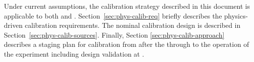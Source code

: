 Under current assumptions, the calibration strategy described in this document is applicable to both  and . %
Section~\ref{sec:phys-calib-req} briefly describes the physics-driven calibration requirements. 
The nominal   calibration design is described in Section~\ref{sec:phys-calib-sources}. Finally,
Section \ref{sec:phys-calib-approach} describes a staging plan for calibration
from after the  through to the operation of the experiment including design validation at .

